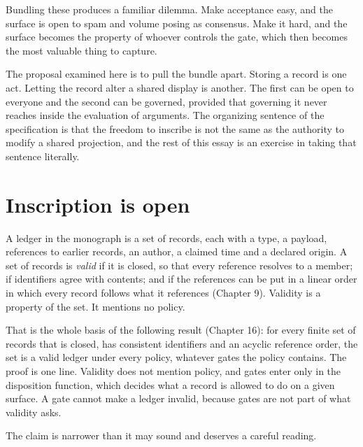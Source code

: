 \documentclass[11pt]{article}
\begin{document}
Bundling these produces a familiar dilemma. Make acceptance easy, and the surface is open to spam and volume posing as consensus. Make it hard, and the surface becomes the property of whoever controls the gate, which then becomes the most valuable thing to capture.

The proposal examined here is to pull the bundle apart. Storing a record is one act. Letting the record alter a shared display is another. The first can be open to everyone and the second can be governed, provided that governing it never reaches inside the evaluation of arguments. The organizing sentence of the specification is that the freedom to inscribe is not the same as the authority to modify a shared projection, and the rest of this essay is an exercise in taking that sentence literally.

\section{Inscription is open}\label{sec:open}

A ledger in the monograph is a set of records, each with a type, a payload, references to earlier records, an author, a claimed time and a declared origin. A set of records is \emph{valid} if it is closed, so that every reference resolves to a member; if identifiers agree with contents; and if the references can be put in a linear order in which every record follows what it references (Chapter 9). Validity is a property of the set. It mentions no policy.

That is the whole basis of the following result (Chapter 16): for every finite set of records that is closed, has consistent identifiers and an acyclic reference order, the set is a valid ledger under every policy, whatever gates the policy contains. The proof is one line. Validity does not mention policy, and gates enter only in the disposition function, which decides what a record is allowed to do on a given surface. A gate cannot make a ledger invalid, because gates are not part of what validity asks.

The claim is narrower than it may sound and deserves a careful reading.
\end{document}
